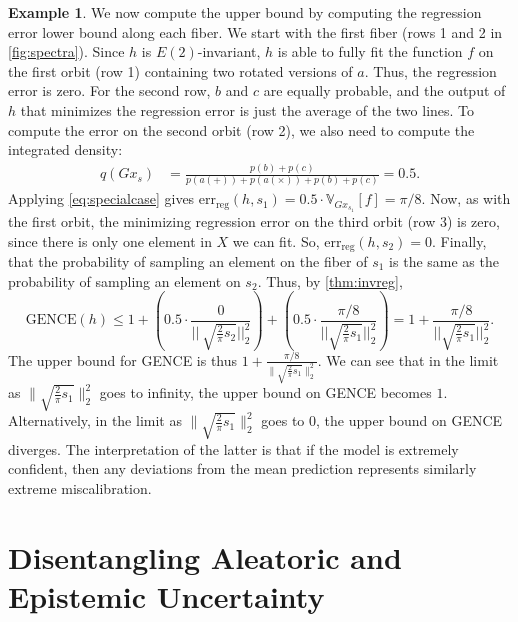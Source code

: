 \documentclass[10pt]{article} %
\theoremstyle{definition}
\newtheorem{example}{Example}
\newcommand{\GENCE}{\mathrm{GENCE}(h)}
\begin{document}
\begin{example}
We now compute the upper bound by computing the regression error lower bound along each fiber. We start with the first fiber (rows 1 and 2 in \cref{fig:spectra}). Since $h$ is $E(2)$-invariant, $h$ is able to fully fit the function $f$ on the first orbit (row 1) containing two rotated versions of $a$. Thus, the regression error is zero. For the second row, $b$ and $c$ are equally probable, and the output of $h$ that minimizes the regression error is just the average of the two lines. To compute the error on the second orbit (row 2), we also need to compute the integrated density:
%
\begin{align*}
    q(Gx_s) &= \frac{p(b) + p(c)}{p(a(+)) + p(a(\times)) + p(b) + p(c)} = 0.5.
\end{align*}
%
Applying \cref{eq:specialcase} gives $\text{err}_{\text{reg}}(h,s_1) = 0.5 \cdot \mathbb{V}_{Gx_{s_1}}[f] = \pi/8$. Now, as with the first orbit, the minimizing regression error on the third orbit (row 3) is zero, since there is only one element in $X$ we can fit. So, $\text{err}_{\text{reg}}(h, s_2) = 0$. Finally, that the probability of sampling an element on the fiber of $s_1$ is the same as the probability of sampling an element on $s_2$. Thus, by \cref{thm:invreg},
%
\begin{equation*}
    \GENCE \leq 1 + \left(0.5 \cdot \frac{0}{||\ \sqrt{\frac{2}{\pi}s_2}||_2^2}\right) + \left(0.5 \cdot   \frac{\pi / 8}{|| \sqrt{\frac{2}{\pi}s_1}||_2^2}\right) = 1 + \frac{\pi / 8}{|| \sqrt{\frac{2}{\pi}s_1}||_2^2}.
\end{equation*}
%
The upper bound for GENCE  is thus $1 + \frac{\pi/8}{\lVert \sqrt{\frac{2}{\pi}s_1} \rVert_2^2}$. We can see that in the limit as $\lVert \sqrt{\frac{2}{\pi}s_1} \rVert_2^2 $ goes to infinity, the upper bound on GENCE becomes $1$. Alternatively, in the limit as $\lVert \sqrt{\frac{2}{\pi}s_1} \rVert_2^2 $ goes to $ 0$, the upper bound on GENCE diverges. The interpretation of the latter is that if the model is extremely confident, then any deviations from the mean prediction represents similarly extreme miscalibration.
\end{example}

\section{Disentangling Aleatoric and Epistemic Uncertainty}

\label{sec:uncertainty_taxonomy}
\end{document}
